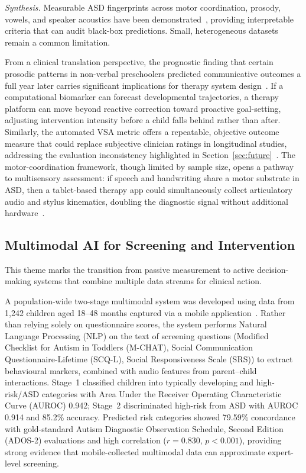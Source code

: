 \documentclass[conference]{IEEEtran}
\begin{document}
\emph{Synthesis.} Measurable ASD fingerprints across motor coordination, prosody, vowels, and speaker acoustics have been demonstrated~\cite{ref6,ref7,ref8,ref9}, providing interpretable criteria that can audit black-box predictions. Small, heterogeneous datasets remain a common limitation.

From a clinical translation perspective, the prognostic finding that certain prosodic patterns in non-verbal preschoolers predicted communicative outcomes a full year later carries significant implications for therapy system design~\cite{ref7}. If a computational biomarker can forecast developmental trajectories, a therapy platform can move beyond reactive correction toward proactive goal-setting, adjusting intervention intensity before a child falls behind rather than after. Similarly, the automated VSA metric offers a repeatable, objective outcome measure that could replace subjective clinician ratings in longitudinal studies, addressing the evaluation inconsistency highlighted in Section~\ref{sec:future}~\cite{ref8}. The motor-coordination framework, though limited by sample size, opens a pathway to multisensory assessment: if speech and handwriting share a motor substrate in ASD, then a tablet-based therapy app could simultaneously collect articulatory audio and stylus kinematics, doubling the diagnostic signal without additional hardware~\cite{ref6}.

\subsection{Multimodal AI for Screening and Intervention}

This theme marks the transition from passive measurement to active decision-making systems that combine multiple data streams for clinical action.

A population-wide two-stage multimodal system was developed using data from 1,242 children aged 18--48 months captured via a mobile application~\cite{ref10}. Rather than relying solely on questionnaire scores, the system performs Natural Language Processing (NLP) on the text of screening questions (Modified Checklist for Autism in Toddlers (M-CHAT), Social Communication Questionnaire-Lifetime (SCQ-L), Social Responsiveness Scale (SRS)) to extract behavioural markers, combined with audio features from parent--child interactions. Stage~1 classified children into typically developing and high-risk/ASD categories with Area Under the Receiver Operating Characteristic Curve (AUROC) 0.942; Stage~2 discriminated high-risk from ASD with AUROC 0.914 and 85.2\% accuracy. Predicted risk categories showed 79.59\% concordance with gold-standard Autism Diagnostic Observation Schedule, Second Edition (ADOS-2) evaluations and high correlation ($r=0.830$, $p<0.001$), providing strong evidence that mobile-collected multimodal data can approximate expert-level screening.
\end{document}
